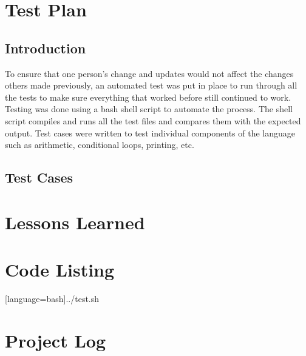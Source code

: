 \documentclass[11pt]{report}
\begin{document}
\chapter{Test Plan}
\section{Introduction}
To ensure that one person's change and updates would not affect the changes others made previously, an automated test was put in place to run through all the tests to make sure everything that worked before still continued to work. Testing was done using a bash shell script to automate the process. The shell script compiles and runs all the test files and compares them with the expected output. Test cases were written to test individual components of the language such as arithmetic, conditional loops, printing, etc.

\section{Test Cases}










\chapter{Lessons Learned}

\appendix
\chapter{Code Listing}






[language=bash]{../test.sh}

\chapter{Project Log}

\end{document}
